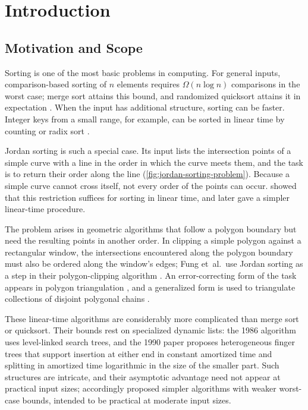 \chapter{Introduction}
\label{chap:introduction}

\section{Motivation and Scope}
\label{sec:introduction-motivation}
\label{sec:introduction-scope}

Sorting is one of the most basic problems in computing. For general inputs,
comparison-based sorting of $n$ elements requires $\Omega(n\log n)$
comparisons in the worst case; merge sort attains this bound, and randomized quicksort
attains it in expectation \parencite{cormen2009introduction}. When the input
has additional structure, sorting can be faster. Integer keys from a small
range, for example, can be sorted in linear time by counting or radix sort
\parencite{cormen2009introduction}.

Jordan sorting is such a special case. Its input lists the intersection
points of a simple curve with a line in the order in which the curve meets
them, and the task is to return their order along the line
(\cref{fig:jordan-sorting-problem}). Because a simple curve cannot cross
itself, not every order of the points can occur.
\Textcite{hoffmann1986sorting} showed that this restriction suffices for
sorting in linear time, and \textcite{fung1990simplified} later gave a
simpler linear-time procedure.

The problem arises in geometric algorithms that follow a polygon boundary but
need the resulting points in another order. In clipping a simple polygon
against a rectangular window, the intersections encountered along the polygon
boundary must also be ordered along the window's edges; Fung et~al.\ use
Jordan sorting as a step in their polygon-clipping algorithm
\parencite{fung1990simplified}. An error-correcting form of the task appears
in polygon triangulation \parencite{tarjan1988triangulating}, and a
generalized form is used to triangulate collections of disjoint polygonal
chains \parencite{baryehuda1994triangulating}.

These linear-time algorithms are considerably more complicated than merge sort
or quicksort. Their bounds rest on specialized dynamic lists: the 1986
algorithm uses level-linked search trees, and the 1990 paper proposes
heterogeneous finger trees that support insertion at either end in constant
amortized time and splitting in amortized time logarithmic in the size of the
smaller part. Such structures are intricate, and their asymptotic advantage
need not appear at practical input sizes; \textcite{sojka1997simple}
accordingly proposed simpler algorithms with weaker worst-case bounds,
intended to be practical at moderate input sizes.

